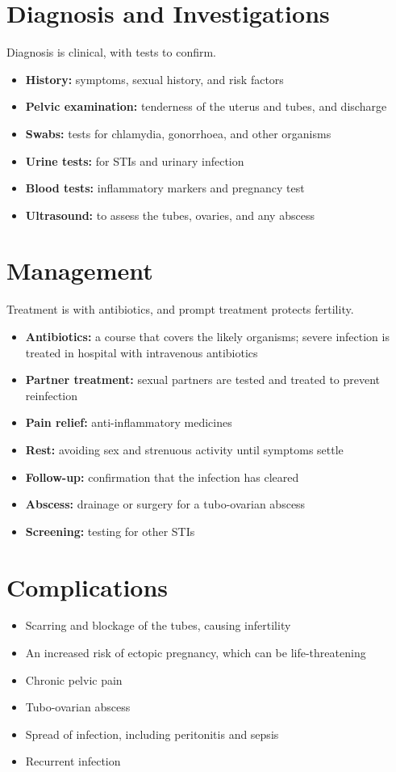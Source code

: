 \section*{Diagnosis and Investigations}
Diagnosis is clinical, with tests to confirm.
\begin{itemize}
    \item \textbf{History:} symptoms, sexual history, and risk factors
    \item \textbf{Pelvic examination:} tenderness of the uterus and tubes, and discharge
    \item \textbf{Swabs:} tests for chlamydia, gonorrhoea, and other organisms
    \item \textbf{Urine tests:} for STIs and urinary infection
    \item \textbf{Blood tests:} inflammatory markers and pregnancy test
    \item \textbf{Ultrasound:} to assess the tubes, ovaries, and any abscess
\end{itemize}

\section*{Management}
Treatment is with antibiotics, and prompt treatment protects fertility.
\begin{itemize}
    \item \textbf{Antibiotics:} a course that covers the likely organisms; severe infection is treated in hospital with intravenous antibiotics
    \item \textbf{Partner treatment:} sexual partners are tested and treated to prevent reinfection
    \item \textbf{Pain relief:} anti-inflammatory medicines
    \item \textbf{Rest:} avoiding sex and strenuous activity until symptoms settle
    \item \textbf{Follow-up:} confirmation that the infection has cleared
    \item \textbf{Abscess:} drainage or surgery for a tubo-ovarian abscess
    \item \textbf{Screening:} testing for other STIs
\end{itemize}

\section*{Complications}
\begin{itemize}
    \item Scarring and blockage of the tubes, causing infertility
    \item An increased risk of ectopic pregnancy, which can be life-threatening
    \item Chronic pelvic pain
    \item Tubo-ovarian abscess
    \item Spread of infection, including peritonitis and sepsis
    \item Recurrent infection
\end{itemize}

